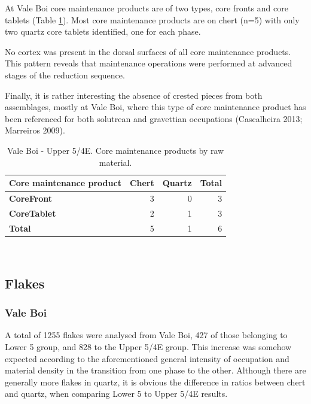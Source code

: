 \documentclass[12pt,twoside]{reedthesis}
\begin{document}
At Vale Boi core maintenance products are of two types, core fronts and core tablets (Table \ref{tab:corepreptypeVB}). Most core maintenance products are on chert (n=5) with only two quartz core tablets identified, one for each phase.

No cortex was present in the dorsal surfaces of all core maintenance products. This pattern reveals that maintenance operations were performed at advanced stages of the reduction sequence.

Finally, it is rather interesting the absence of crested pieces from both assemblages, mostly at Vale Boi, where this type of core maintenance product has been referenced for both solutrean and gravettian occupations (Cascalheira 2013; Marreiros 2009).
\begin{table}[!h]

\caption{\label{tab:corepreptypeVB}Vale Boi - Upper 5/4E. Core maintenance products by raw material.}
\centering
\fontsize{9}{11}\selectfont
\begin{tabular}[t]{>{\bfseries}lrrr}
\toprule
Core maintenance product & Chert & Quartz & Total\\
\midrule
CoreFront & 3 & 0 & 3\\
CoreTablet & 2 & 1 & 3\\
Total & 5 & 1 & 6\\
\bottomrule
\end{tabular}
\end{table}
~

\hypertarget{flakes}{%
\subsection{Flakes}\label{flakes}}

\hypertarget{vale-boi-5}{%
\subsubsection{Vale Boi}\label{vale-boi-5}}

A total of 1255 flakes were analysed from Vale Boi, 427 of those belonging to Lower 5 group, and 828 to the Upper 5/4E group. This increase was somehow expected according to the aforementioned general intensity of occupation and material density in the transition from one phase to the other. Although there are generally more flakes in quartz, it is obvious the difference in ratios between chert and quartz, when comparing Lower 5 to Upper 5/4E results.
\end{document}
